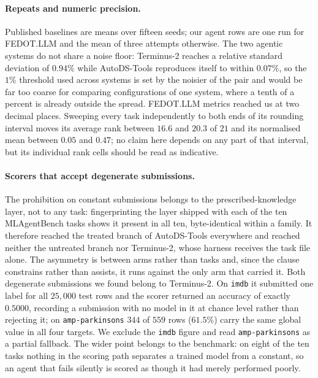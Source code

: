 \paragraph{Repeats and numeric precision.} Published baselines are means over
fifteen seeds; our agent rows are one run for FEDOT.LLM and the mean of three
attempts otherwise. The two agentic systems do not share a noise floor:
Terminus-2 reaches a relative standard deviation of $0.94\%$ while AutoDS-Tools
reproduces itself to within $0.07\%$, so the $1\%$ threshold used across systems
is set by the noisier of the pair and would be far too coarse for comparing
configurations of one system, where a tenth of a percent is already outside the
spread. FEDOT.LLM metrics reached us at two decimal places. Sweeping every task
independently to both ends of its rounding interval moves its average rank
between $16.6$ and $20.3$ of $21$ and its normalised mean between $0.05$ and
$0.47$; no claim here depends on any part of that interval, but its individual
rank cells should be read as indicative.

\begin{sloppypar}
\paragraph{Scorers that accept degenerate submissions.} The prohibition on
constant submissions belongs to the prescribed-knowledge layer, not to any task:
fingerprinting the layer shipped with each of the ten MLAgentBench tasks shows it
present in all ten, byte-identical within a family. It therefore reached the
treated branch of AutoDS-Tools everywhere and reached neither the untreated
branch nor Terminus-2, whose harness receives the task file alone. The asymmetry
is between arms rather than tasks and, since the clause constrains rather than
assists, it runs against the only arm that carried it. Both degenerate
submissions we found belong to Terminus-2. On \texttt{imdb} it submitted one
label for all $25{,}000$ test rows and the scorer returned an accuracy of exactly
$0.5000$, recording a submission with no model in it at chance level rather than
rejecting it; on \texttt{amp-parkinsons} $344$ of $559$ rows ($61.5\%$) carry the
same global value in all four targets. We exclude the \texttt{imdb} figure and
read \texttt{amp-parkinsons} as a partial fallback. The wider point belongs to
the benchmark: on eight of the ten tasks nothing in the scoring path separates a
trained model from a constant, so an agent that fails silently is scored as
though it had merely performed poorly.
\end{sloppypar}


